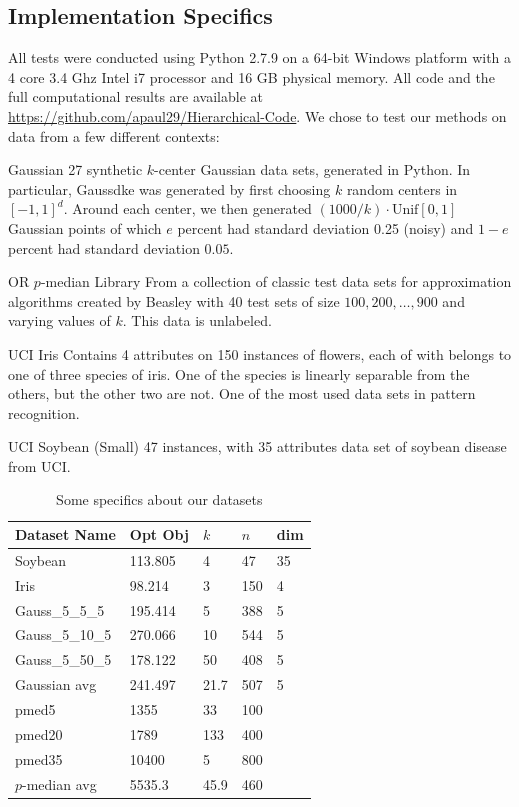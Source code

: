\documentclass[conference, 10pt, final]{IEEEtran}
\begin{document}
\subsection{Implementation Specifics}

All tests were conducted using Python 2.7.9 on a 64-bit Windows platform with a 4 core 3.4 Ghz Intel i7 processor and 16 GB physical memory. All code and the full computational results are available at \url{https://github.com/apaul29/Hierarchical-Code}.
We chose to test our methods on data from a few different contexts:
\begin{LaTeXdescription}
\item[Gaussian] 27 synthetic $k$-center Gaussian data sets, generated in Python. In particular, Gauss\textunderscore d\textunderscore k\textunderscore e was generated by first choosing $k$ random centers in $[-1,1]^d$. Around each center, we then generated $(1000/k) \cdot \mathrm{Unif}[0,1]$ Gaussian points of which $e$ percent had standard deviation 0.25 (noisy) and $1-e$ percent had standard deviation $0.05$. 
\item[OR $p$-median Library] \cite{Beasley} From a collection of classic test data sets for approximation algorithms created by Beasley with 40 test sets of size $100, 200, \ldots, 900$ and varying values of $k$. This data is unlabeled.
\item[UCI Iris] \cite{Iris} Contains 4 attributes on 150 instances of flowers, each of with belongs to one of three species of iris.  One of the species is linearly separable from the others, but the other two are not.  One of the most used data sets in pattern recognition.
\item[UCI Soybean (Small)] \cite{Soybean} 47 instances, with 35 attributes data set of soybean disease from UCI.
\end{LaTeXdescription} 

\begin{table}[!t]
\caption{Some specifics about our datasets}
\label{table_specifics}
\centering
\begin{tabular}{ | l | l | l | l | l | }
\hline
 Dataset Name & Opt Obj & $k$ & $n$ & dim \\ \hline
Soybean & 113.805 & 4 & 47 & 35 \\ 
Iris & 98.214 & 3 & 150 & 4 \\ 
Gauss\_5\_5\_5 & 195.414 & 5 & 388 & 5 \\ 
Gauss\_5\_10\_5 & 270.066 & 10 & 544 & 5 \\ 
Gauss\_5\_50\_5 & 178.122 & 50 & 408 & 5 \\ 
Gaussian avg & 241.497 & 21.7 & 507 & 5 \\ 
pmed5 & 1355 & 33 & 100 & \  \\ 
pmed20 & 1789 & 133 & 400 & \  \\ 
pmed35 & 10400 & 5 & 800 & \  \\ 
$p$-median avg & 5535.3 & 45.9 & 460 & \  \\ \hline
 \end{tabular}
\end{table}
\end{document}
